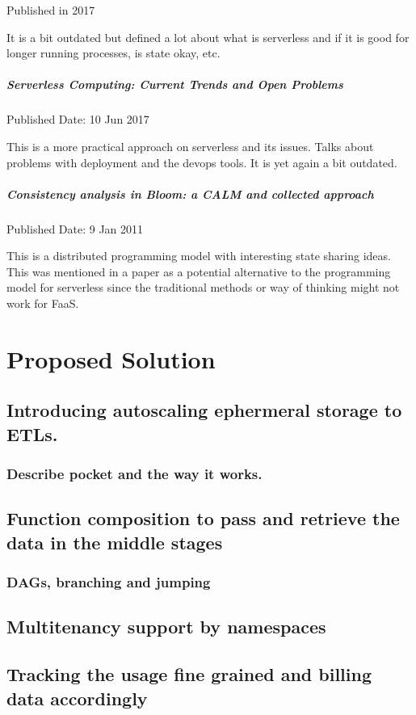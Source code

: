 \documentclass[12pt,titlepage]{article}
\begin{document}
Published in 2017

It is a bit outdated but defined a lot about what is serverless and if it is good for longer running processes, is state okay, etc.

\subparagraph{Serverless Computing: Current Trends and Open Problems}
\label{sec:org5acf89d}

Published Date: 10 Jun 2017

This is a more practical approach on serverless and its issues.
Talks about problems with deployment and the devops tools. 
It is yet again a bit outdated. 

\subparagraph{Consistency analysis in Bloom: a CALM and collected approach}
\label{sec:org8db3f48}

Published Date: 9 Jan 2011

This is a distributed programming model with interesting state sharing ideas. This was mentioned in a paper as a potential alternative to the programming model for serverless since the traditional methods or way of thinking might not work for FaaS.

\section{Proposed Solution}
\label{sec:org8e70af2}
\subsection{Introducing autoscaling ephermeral storage to ETLs.}
\label{sec:org791b541}
\subsubsection{Describe pocket and the way it works.}
\label{sec:orgacc7c56}
\subsection{Function composition to pass and retrieve the data in the middle stages}
\label{sec:org6ea5d0b}
\subsubsection{DAGs, branching and jumping}
\label{sec:org4189bc8}
\subsection{Multitenancy support by namespaces}
\label{sec:org13924d7}
\subsection{Tracking the usage fine grained and billing data accordingly}
\label{sec:org216bc0b}
\end{document}
